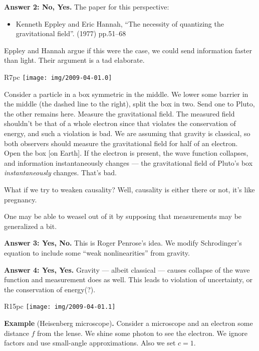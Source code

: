 \bigbreak\noindent\textbf{Answer 2: No, Yes.}
The paper for this perspective:

\begin{itemize}
\item Kenneth Eppley and Eric Hannah,
``The necessity of quantizing the gravitational field''.
  (1977) pp.51--68
{\tt{}}
\end{itemize}

Eppley and Hannah argue if this were the case, we could send information
faster than light. Their argument is a tad elaborate.

\begin{wrapfigure}{R}{7pc}
\centering
\texttt{[image: img/2009-04-01.0]}
\end{wrapfigure}

Consider a particle in a box symmetric in the middle. We lower some
barrier in the middle (the dashed line to the right), split the box in
two. Send one to Pluto, the other remains here. Measure the
gravitational field. The measured field shouldn't be that of a whole
electron since that violates the conservation of energy, and such a
violation is bad. We are assuming that gravity is classical, so both
observers should measure the gravitational field for half of an
electron. Open the box [on Earth]. If the electron is present, the wave
function collapses, and information instantaneously changes --- the
gravitational field of Pluto's box \emph{instantaneously}
changes. That's bad.

What if we try to weaken causality? Well, causality is either there or
not, it's like pregnancy.

One may be able to weasel out of it by supposing that measurements may
be generalized a bit.

\bigbreak\noindent\textbf{Answer 3: Yes, No.}  This is Roger Penrose's
idea. We modify Schrodinger's equation to include some ``weak
nonlinearities'' from gravity.

\bigbreak\noindent\textbf{Answer 4: Yes, Yes.}  Gravity --- albeit
classical --- causes collapse of the wave function and measurement does
as well. This leads to violation of uncertainty, or the conservation of
energy(?).


\begin{wrapfigure}{R}{15pc}\vskip-2pc
\centering
\texttt{[image: img/2009-04-01.1]}
\end{wrapfigure}\bigbreak\noindent\textbf{Example} (Heisenberg microscope)\textbf{.}
Consider a microscope and an electron some distance $f$ from the
lense. We shine some photon to see the electron. We ignore factors and
use small-angle approximations. Also we set $c=1$.

